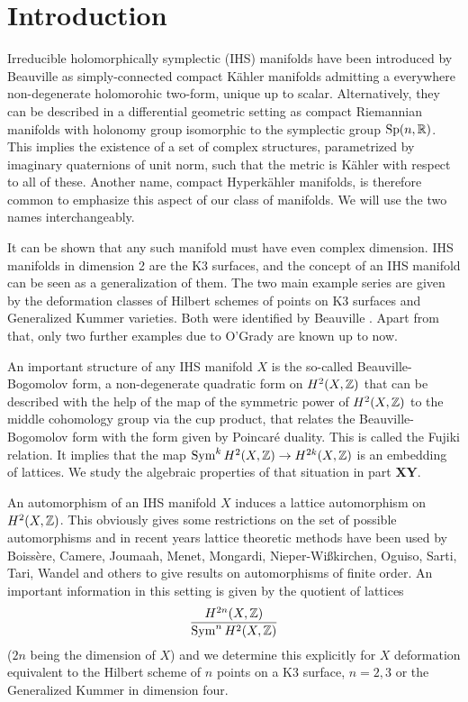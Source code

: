 \section{Introduction}

Irreducible holomorphically symplectic (IHS) manifolds have been introduced by Beauville \cite{Beauville} as simply-connected compact K\"ahler manifolds admitting a everywhere non-degenerate holomorohic two-form, unique up to scalar. 
Alternatively, they can be described in a differential geometric setting as compact Riemannian manifolds with holonomy group isomorphic to the symplectic group $\operatorname{Sp}(n,\mathbb{R})$. This implies the existence of a set of complex structures, parametrized by imaginary quaternions of unit norm, such that the metric is K\"ahler with respect to all of these. 
Another name, compact Hyperk\"ahler manifolds, is therefore common to emphasize this aspect of our class of manifolds. We will use the two names interchangeably.

It can be shown that any such manifold must have even complex dimension. IHS manifolds in dimension 2 are the K3 surfaces, and the concept of an IHS manifold can be seen as a generalization of them. The two main example series are given by the deformation classes of Hilbert schemes of points on K3 surfaces and Generalized Kummer varieties. Both were identified by Beauville \cite{Beauville}. Apart from that, only two further examples due to O'Grady are known up to now.

An important structure of any IHS manifold $X$ is the so-called Beauville-Bogomolov form, a non-degenerate quadratic form on $H^2(X,\mathbb{Z})$ that can be described with the help of the map of the symmetric power of $H^2(X,\mathbb{Z})$ to the middle cohomology group via the cup product, that relates the Beauville-Bogomolov form with the form given by Poincar\'e duality. This is called the Fujiki relation. It implies that the map $\operatorname{Sym}^k H^2(X,\mathbb{Z})\rightarrow H^{2k}(X,\mathbb{Z})$ is an embedding of lattices. We study the algebraic properties of that situation in part \textbf{XY}.

An automorphism of an IHS manifold $X$ induces a lattice automorphism on $H^2(X,\mathbb{Z})$. This obviously gives some restrictions on the set of possible automorphisms and
in recent years lattice theoretic methods have been used by
Boiss\`ere, Camere, Joumaah, Menet, Mongardi, Nieper-Wi\ss kirchen, Oguiso, Sarti, Tari, Wandel and others to give results on
automorphisms of finite order. 
An important information in this setting is given by the quotient of lattices
$$
\frac{H^{2n}(X,\mathbb{Z})}{\operatorname{Sym}^n H^2(X,\mathbb{Z})}
$$
($2n$ being the dimension of $X$) and we determine this explicitly for $X$ deformation equivalent to the Hilbert scheme of $n$ points on a K3 surface, $n=2,3$ or the Generalized Kummer in dimension four. 

